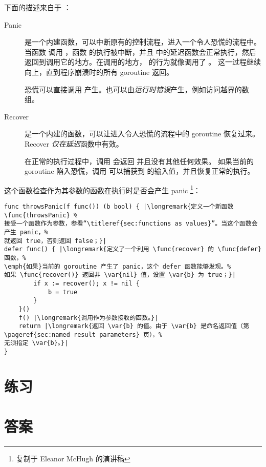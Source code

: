 下面的描述来自于 \cite{go_blog_panic}：
\begin{description}
\item[Panic]{是一个内建函数，可以中断原有的控制流程，进入一个令人恐慌的流程中。
当函数  调用 ，函数  的执行被中断，并且  中的延迟函数会正常执行，然后
 返回到调用它的地方。在调用的地方， 的行为就像调用了 。
这一过程继续向上，直到程序崩溃时的所有 goroutine 返回。

恐慌可以直接调用  产生。也可以由\emph{运行时错误}产生，例如访问越界的数组。}

\item[Recover]{是一个内建的函数，可以让进入令人恐慌的流程中的 goroutine 恢复过来。
Recover \emph{仅在}\emph{延迟}函数中有效。

在正常的执行过程中，调用  会返回  并且没有其他任何效果。
如果当前的 goroutine 陷入恐慌，调用  可以捕获到  的输入值，并且恢复正常的执行。}
\end{description}

这个函数检查作为其参数的函数在执行时是否会产生 panic
\footnote{复制于 Eleanor McHugh 的演讲稿}：
\begin{lstlisting}
func throwsPanic(f func()) (b bool) { |\longremark{定义一个新函数 \func{throwsPanic} %
接受一个函数作为参数，参看“\titleref{sec:functions as values}”。当这个函数会产生 panic，%
就返回 true，否则返回 false；}|
defer func() { |\longremark{定义了一个利用 \func{recover} 的 \func{defer} 函数，%
\emph{如果}当前的 goroutine 产生了 panic，这个 defer 函数能够发现。%
如果 \func{recover()} 返回非 \var{nil} 值，设置 \var{b} 为 true；}|
        if x := recover(); x != nil {
            b = true
        }
    }()
    f() |\longremark{调用作为参数接收的函数。}|
    return |\longremark{返回 \var{b} 的值。由于 \var{b} 是命名返回值（第 \pageref{sec:named result parameters} 页），%
无须指定 \var{b}。}|
}
\end{lstlisting}
\showremarks

\section{练习}




















\cleardoublepage
\section{答案}
\shipoutAnswer
